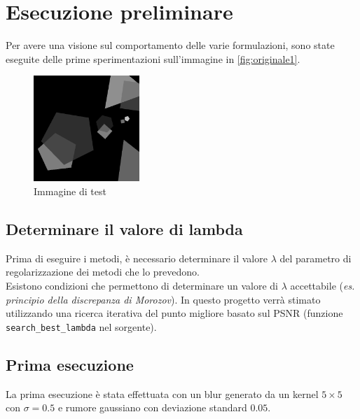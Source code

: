 \documentclass[11pt]{article}
\begin{document}
\newpage
\section{Esecuzione preliminare}
\label{chap:lambda}
Per avere una visione sul comportamento delle varie formulazioni, sono state eseguite delle prime sperimentazioni sull'immagine in \autoref{fig:originale1}.
\begin{figure}[H]
    \centering
    \includegraphics[width=4cm]{esecuzione/originale.png}
    \caption{Immagine di test}
    \label{fig:originale1}
\end{figure}

\subsection{Determinare il valore di lambda}
Prima di eseguire i metodi, è necessario determinare il valore $\lambda$ del parametro di regolarizzazione dei metodi che lo prevedono.\\
Esistono condizioni che permettono di determinare un valore di $\lambda$ accettabile (\textit{es. principio della discrepanza di Morozov}). In questo progetto verrà stimato utilizzando una ricerca iterativa del punto migliore basato sul PSNR (funzione \texttt{search\_best\_lambda} nel sorgente).

\subsection{Prima esecuzione}
La prima esecuzione è stata effettuata con un blur generato da un kernel $5 \times 5$ con $\sigma=0.5$ e rumore gaussiano con deviazione standard $0.05$.
\end{document}
